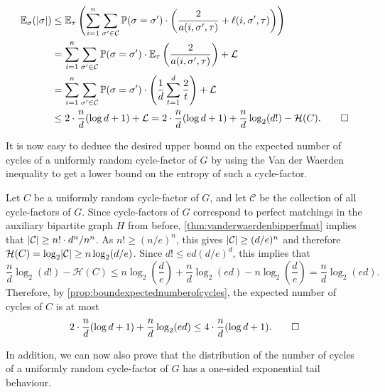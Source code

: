 \documentclass[11pt]{article}
\makeatletter
\theoremstyle{plain}
\theoremstyle{definition}
\renewenvironment{proof}[1][\proofname]
{\par\pushQED{\qed}
	\normalfont\topsep6\p@\@plus6\p@\relax\trivlist
	\item[\hskip\labelsep\bfseries#1\@addpunct{.}]
	\ignorespaces}
{\popQED\endtrivlist\@endpefalse}
\newcommand{\pr}{\mathbb{P}}
\newcommand{\ev}{\mathbb{E}}
\newcommand{\ent}{\mathcal{H}}
\newcommand{\cL}{\mathcal L}
\newcommand{\C}{\mathcal C}
\newcommand{\logt}{\log_2}
\DeclarePairedDelimiter{\abs}{\lvert}{\rvert}
\makeatother
\begin{document}
\begin{proof}
    \begin{align*}
        \ev_\sigma(\abs{\sigma}) & \le \ev_\tau\left(\sum_{i=1}^n \sum_{\sigma' \in \C} \pr(\sigma = \sigma') \cdot \left(\frac{2}{a(i,\sigma',\tau)} + \ell(i,\sigma',\tau)\right)\right) \\
        & = \sum_{i=1}^n \sum_{\sigma' \in \C} \pr(\sigma = \sigma') \cdot \ev_\tau\left(\frac{2}{a(i,\sigma',\tau)}\right) + \cL \\
        & = \sum_{i=1}^n \sum_{\sigma' \in \C} \pr(\sigma = \sigma') \cdot \left(\frac{1}{d} \sum_{t = 1}^d \frac{2}{t}\right) + \cL \\
        & \le 2 \cdot \frac{n}{d} (\log d + 1) + \cL = 2 \cdot \frac{n}{d} (\log d + 1) + \frac{n}{d} \logt(d!) - \ent(C). \qedhere
    \end{align*}
\end{proof}

It is now easy to deduce the desired upper bound on the expected number of cycles of a uniformly random cycle-factor of $G$ by using the Van der Waerden inequality to get a lower bound on the entropy of such a cycle-factor.

\begin{proof}[Proof of \cref{thm:smallcyclefactordirected}]
    Let $C$ be a uniformly random cycle-factor of $G$, and let $\C$ be the collection of all cycle-factors of $G$. Since cycle-factors of $G$ correspond to perfect matchings in the auxiliary bipartite graph $H$ from before, \cref{thm:vanderwaerdenbipperfmat} implies that $\abs{\C} \ge n! \cdot d^n / n^n$. As $n! \ge (n/e)^n$, this gives $\abs{\C} \ge (d/e)^n$ and therefore $\ent(C) = \logt \abs{\C} \ge n \logt(d/e)$. Since $d! \le e d (d/e)^d$, this implies that
    \[
        \frac{n}{d} \logt(d!) - \ent(C) \le n \logt\left(\frac{d}{e}\right) + \frac{n}{d} \logt(ed) - n \logt\left(\frac{d}{e}\right) = \frac{n}{d} \logt(ed).
    \]
    Therefore, by \cref{prop:boundexpectednumberofcycles}, the expected number of cycles of $C$ is at most
    \[
        2 \cdot \frac{n}{d} (\log d + 1) + \frac{n}{d} \logt(ed) \le 4 \cdot \frac{n}{d} (\log d + 1). \qedhere
    \]
\end{proof}

In addition, we can now also prove that the distribution of the number of cycles of a uniformly random cycle-factor of $G$ has a one-sided exponential tail behaviour.
\end{document}
